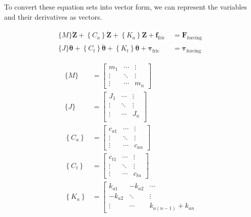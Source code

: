 To convert these equation sets into vector form, we can represent the variables and their derivatives as vectors.

\begin{align}
  \{M\} \ddot{\boldsymbol{Z}}+\left\{C_a\right\} \dot{\boldsymbol{Z}}+\left\{K_a\right\} \boldsymbol{Z}+\boldsymbol{f}_{\text {fric }} &= \boldsymbol{F}_{\text {forcing }} \label{eq:em_axial_vector_form}\\
  \{J\} \ddot{\boldsymbol{\theta}}+\left\{C_t\right\} \dot{\boldsymbol{\theta}}+\left\{K_t\right\} \boldsymbol{\theta}+\boldsymbol{\tau}_{\text {fric }} &= \boldsymbol{\tau}_{\text {forcing }} \label{eq:em_torsional_vector_form}
\end{align}


\begin{align}
	\{M\} &= \left[\begin{array}{ccc}
				m_1 & \cdots & \vdots \\
				\vdots & \ddots & \vdots \\
				\vdots & \cdots & m_n
				\end{array}\right] \\
	\{J\} &= \left[\begin{array}{ccc}
			J_1 & \cdots & \vdots \\
			\vdots & \ddots & \vdots \\
			\vdots & \cdots & J_n  \\
  			\end{array}\right] \\
	\left\{C_a\right\} &= \left[\begin{array}{ccc}
							c_{a 1} & \cdots & \vdots \\
							\vdots & \ddots & \vdots \\
							\vdots & \cdots & c_{a n}
							\end{array}\right] \\
	\left\{C_t\right\} &= \left[\begin{array}{ccc}
							c_{t 1} & \cdots & \vdots \\
							\vdots & \ddots & \vdots \\
							\vdots & \cdots & c_{t n}
							\end{array}\right] \\
 	\left\{K_a\right\} &= \left[\begin{array}{ccc}
							k_{a 1} & -k_{a 2} & \cdots \\
							-k_{a 2} & \ddots & \vdots \\
							\vdots & \cdots & k_{a(n-1)}+k_{a n}

\end{array}
\end{align}
